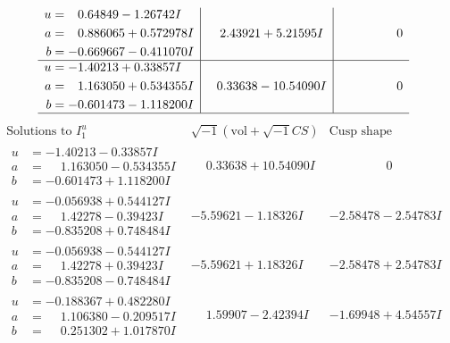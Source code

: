 \documentclass[1p]{elsarticle_modified}
\theoremstyle{definition}
\newcommand{\I}{\sqrt{-1}}
\begin{document}
$$\begin{array}{c|c|c}
\begin{aligned}
u &= \phantom{-}0.64849 - 1.26742 I \\
a &= \phantom{-}0.886065 + 0.572978 I \\
b &= -0.669667 - 0.411070 I\end{aligned}
 & \phantom{-}2.43921 + 5.21595 I & \phantom{-0.000000 } 0 \\ \hline\begin{aligned}
u &= -1.40213 + 0.33857 I \\
a &= \phantom{-}1.163050 + 0.534355 I \\
b &= -0.601473 - 1.118200 I\end{aligned}
 & \phantom{-}0.33638 - 10.54090 I & \phantom{-0.000000 } 0\\
 \hline 
 \end{array}$$\newpage$$\begin{array}{c|c|c}  
\text{Solutions to }I^u_{1}& \I (\text{vol} + \sqrt{-1}CS) & \text{Cusp shape}\\
 \hline 
\begin{aligned}
u &= -1.40213 - 0.33857 I \\
a &= \phantom{-}1.163050 - 0.534355 I \\
b &= -0.601473 + 1.118200 I\end{aligned}
 & \phantom{-}0.33638 + 10.54090 I & \phantom{-0.000000 } 0 \\ \hline\begin{aligned}
u &= -0.056938 + 0.544127 I \\
a &= \phantom{-}1.42278 - 0.39423 I \\
b &= -0.835208 + 0.748484 I\end{aligned}
 & -5.59621 - 1.18326 I & -2.58478 - 2.54783 I \\ \hline\begin{aligned}
u &= -0.056938 - 0.544127 I \\
a &= \phantom{-}1.42278 + 0.39423 I \\
b &= -0.835208 - 0.748484 I\end{aligned}
 & -5.59621 + 1.18326 I & -2.58478 + 2.54783 I \\ \hline\begin{aligned}
u &= -0.188367 + 0.482280 I \\
a &= \phantom{-}1.106380 - 0.209517 I \\
b &= \phantom{-}0.251302 + 1.017870 I\end{aligned}
 & \phantom{-}1.59907 - 2.42394 I & -1.69948 + 4.54557 I \\ \hline\begin{aligned}

\end{aligned}
\end{array}$$
\end{document}
